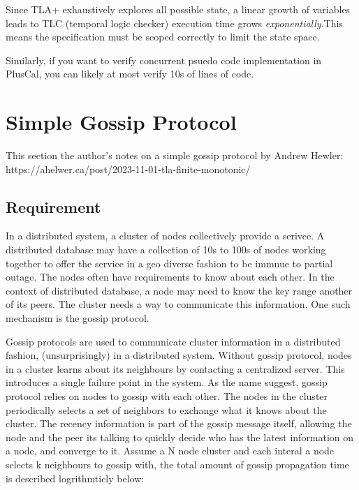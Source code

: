 \documentclass{report}
\begin{document}
Since TLA+ exhaustively explores all possible state, a linear growth of
variables leads to TLC (temporal logic checker) execution time grows
\textit{exponentially}.This means the specification must be scoped correctly to
limit the state space.\newline

Similarly, if you want to verify concurrent psuedo code implementation in
PlusCal, you can likely at most verify 10s of lines of code.

\chapter{Simple Gossip Protocol}

This section the author's notes on a simple gossip protocol by Andrew Hewler:\newline
https://ahelwer.ca/post/2023-11-01-tla-finite-monotonic/\newline

\section{Requirement}

In a distributed system, a cluster of nodes collectively provide a serivce. A
distributed database may have a collection of 10s to 100s of nodes working
together to offer the service in a geo diverse fashion to be immnue to partial
outage.  The nodes often have requirements to know about each other. In the
context of distributed database, a node may need to know the key range another
of its peers. The cluster needs a way to communicate this information. One such
mechanism is the gossip protocol.\newline

Gossip protocols are used to communicate cluster information in a distributed
fashion, (unsurprisingly) in a distributed system. Without gossip protocol, 
nodes in a cluster learns about its neighbours by contacting a centralized
server. This introduces a single failure point in the system. As the name
suggest, gossip protocol relies on nodes to gossip with each other. The nodes in
the cluster periodically selects a set of neighbors to exchange what it knows
about the cluster. The recency information is part of the gossip message
itself, allowing the node and the peer its talking to quickly decide who has the
latest information on a node, and converge to it. Assume a N node cluster and
each interal a node selects k neighbours to gossip with, the total amount of
gossip propagation time is described logrithmticly below:
\end{document}
